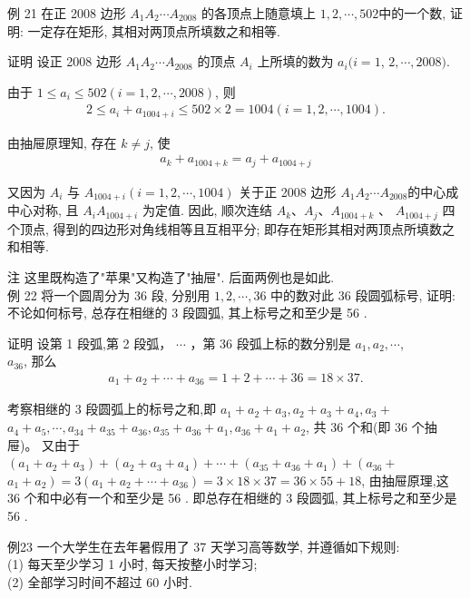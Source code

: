 \documentclass[10pt]{article}
\begin{document}
例 21 在正 2008 边形 $A_{1} A_{2} \cdots A_{2008}$ 的各顶点上随意填上 $1,2, \cdots, 502$中的一个数, 证明: 一定存在矩形, 其相对两顶点所填数之和相等.

证明 设正 2008 边形 $A_{1} A_{2} \cdots A_{2008}$ 的顶点 $A_{i}$ 上所填的数为 $a_{i}(i=1$, $2, \cdots, 2008)$.

由于 $1 \leqslant a_{i} \leqslant 502(i=1,2, \cdots, 2008)$, 则\\
\begin{align*}
2 \leqslant a_{i}+a_{1004+i} \leqslant 502 \times 2=1004(i=1,2, \cdots, 1004) .
\end{align*}

由抽屉原理知, 存在 $k \neq j$, 使\\
\begin{align*}
a_{k}+a_{1004+k}=a_{j}+a_{1004+j}
\end{align*}

又因为 $A_{i}$ 与 $A_{1004+i}(i=1,2, \cdots, 1004)$ 关于正 2008 边形 $A_{1} A_{2} \cdots A_{2008}$的中心成中心对称, 且 $A_{i} A_{1004+i}$ 为定值. 因此, 顺次连结 $A_{k} 、 A_{j} 、 A_{1004+k}$ 、 $A_{1004+j}$ 四个顶点, 得到的四边形对角线相等且互相平分; 即存在矩形其相对两顶点所填数之和相等.

注 这里既构造了"苹果"又构造了"抽屉". 后面两例也是如此.\\
例 22 将一个圆周分为 36 段, 分别用 $1,2, \cdots, 36$ 中的数对此 36 段圆弧标号, 证明: 不论如何标号, 总存在相继的 3 段圆弧, 其上标号之和至少是 56 .

证明 设第 1 段弧,第 2 段弧， $\cdots$ ，第 36 段弧上标的数分别是 $a_{1}, a_{2}, \cdots$,\\
$a_{36}$, 那么\\
\begin{align*}
a_{1}+a_{2}+\cdots+a_{36}=1+2+\cdots+36=18 \times 37 .
\end{align*}

考察相继的 3 段圆弧上的标号之和,即 $a_{1}+a_{2}+a_{3}, a_{2}+a_{3}+a_{4}, a_{3}+$ $a_{4}+a_{5}, \cdots, a_{34}+a_{35}+a_{36}, a_{35}+a_{36}+a_{1}, a_{36}+a_{1}+a_{2}$, 共 36 个和(即 36 个抽屉)。 又由于 $\left(a_{1}+a_{2}+a_{3}\right)+\left(a_{2}+a_{3}+a_{4}\right)+\cdots+\left(a_{35}+a_{36}+a_{1}\right)+\left(a_{36}+\right.$ $\left.a_{1}+a_{2}\right)=3\left(a_{1}+a_{2}+\cdots+a_{36}\right)=3 \times 18 \times 37=36 \times 55+18$, 由抽屉原理,这 36 个和中必有一个和至少是 56 . 即总存在相继的 3 段圆弧, 其上标号之和至少是 56 .

例23 一个大学生在去年暑假用了 37 天学习高等数学, 并遵循如下规则:\\
(1) 每天至少学习 1 小时, 每天按整小时学习;\\
(2) 全部学习时间不超过 60 小时.
\end{document}
